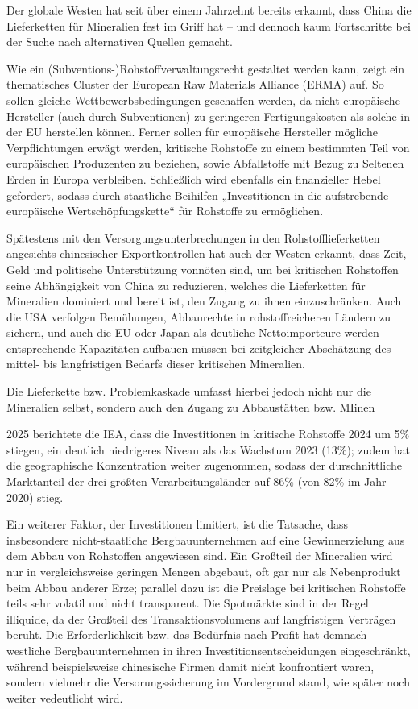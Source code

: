 \documentclass[12pt,a4paper,oneside]{book} %
\begin{document}
	Der globale Westen hat seit über einem Jahrzehnt bereits erkannt, dass China die Lieferketten für Mineralien fest im Griff hat -- und dennoch kaum Fortschritte bei der Suche nach alternativen Quellen gemacht.
	
	Wie ein (Subventions-)Rohstoffverwaltungsrecht gestaltet werden kann, zeigt ein thematisches Cluster der European Raw Materials Alliance (ERMA) auf. So sollen gleiche Wettbewerbsbedingungen geschaffen werden, da nicht-europäische Hersteller (auch durch Subventionen) zu geringeren Fertigungskosten als solche in der EU herstellen können. Ferner sollen für europäische Hersteller mögliche Verpflichtungen erwägt werden, kritische Rohstoffe zu einem bestimmten Teil von europäischen Produzenten zu beziehen, sowie Abfallstoffe mit Bezug zu Seltenen Erden in Europa verbleiben. Schließlich wird ebenfalls ein finanzieller Hebel gefordert, sodass durch staatliche Beihilfen „Investitionen in die aufstrebende europäische Wertschöpfungskette“ für Rohstoffe zu ermöglichen.\autocite[7]{gaus_rare_2021}
	
	Spätestens mit den Versorgungsunterbrechungen in den Rohstofflieferketten angesichts chinesischer Exportkontrollen hat auch der Westen erkannt, dass Zeit, Geld und politische Unterstützung vonnöten sind, um bei kritischen Rohstoffen seine Abhängigkeit von China zu reduzieren, welches die Lieferketten für Mineralien dominiert und bereit ist, den Zugang zu ihnen einzuschränken. Auch die USA verfolgen Bemühungen, Abbaurechte in rohstoffreicheren Ländern zu sichern, und auch die EU oder Japan als deutliche Nettoimporteure werden entsprechende Kapazitäten aufbauen müssen bei zeitgleicher Abschätzung des mittel- bis langfristigen Bedarfs dieser kritischen Mineralien.
	
	Die Lieferkette bzw. Problemkaskade umfasst hierbei jedoch nicht nur die Mineralien selbst, sondern auch den Zugang zu Abbaustätten bzw. MIinen
	
	2025 berichtete die IEA, dass die Investitionen in kritische Rohstoffe 2024 um 5\% stiegen, ein deutlich niedrigeres Niveau als das Wachstum 2023 (13\%); zudem hat die geographische Konzentration weiter zugenommen, sodass der durschnittliche Marktanteil der drei größten Verarbeitungsländer auf 86\% (von 82\% im Jahr 2020) stieg.\autocite{IEA Critical Minerals Outlook 2025, S. 68}
	
	Ein weiterer Faktor, der Investitionen limitiert, ist die Tatsache, dass insbesondere nicht-staatliche Bergbauunternehmen auf eine Gewinnerzielung aus dem Abbau von Rohstoffen angewiesen sind. Ein Großteil der Mineralien wird nur in vergleichsweise geringen Mengen abgebaut, oft gar nur als Nebenprodukt beim Abbau anderer Erze; parallel dazu ist die Preislage bei kritischen Rohstoffe teils sehr volatil und nicht transparent. Die Spotmärkte sind in der Regel illiquide, da der Großteil des Transaktionsvolumens auf langfristigen Verträgen beruht. Die Erforderlichkeit bzw. das Bedürfnis nach Profit hat demnach westliche Bergbauunternehmen in ihren Investitionsentscheidungen eingeschränkt, während beispielsweise chinesische Firmen damit nicht konfrontiert waren, sondern vielmehr die Versorungssicherung im Vordergrund stand, wie später noch weiter vedeutlicht wird.
	
\end{document}
